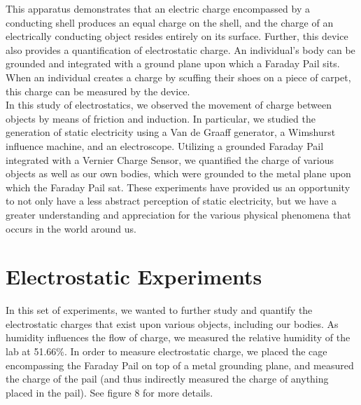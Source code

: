 \documentclass[12pt]{amsart}
\begin{document}
\indent This apparatus demonstrates that an electric charge encompassed by a conducting shell produces an equal charge on the shell, and the charge of an electrically conducting object resides entirely on its surface. Further, this device also provides a quantification of electrostatic charge. An individual’s body can be grounded and integrated with a ground plane upon which a Faraday Pail sits. When an individual creates a charge by scuffing their shoes on a piece of carpet, this charge can be measured by the device.\\

\indent In this study of electrostatics, we observed the movement of charge between objects by means of friction and induction. In particular, we studied the generation of static electricity using a Van de Graaff generator, a Wimshurst influence machine, and an electroscope. Utilizing a grounded Faraday Pail integrated with a Vernier Charge Sensor, we quantified the charge of various objects as well as our own bodies, which were grounded to the metal plane upon which the Faraday Pail sat. These experiments have provided us an opportunity to not only have a less abstract perception of static electricity, but we have a greater understanding and appreciation for the various physical phenomena that occurs in the world around us.

\section{Electrostatic Experiments}
\indent In this set of experiments, we wanted to further study and quantify the electrostatic charges that exist upon various objects, including our bodies. As humidity influences the flow of charge, we measured the relative humidity of the lab at 51.66\%. In order to measure electrostatic charge, we placed the cage encompassing the Faraday Pail on top of a metal grounding plane, and measured the charge of the pail (and thus indirectly measured the charge of anything placed in the pail). See figure 8 for more details. \\
\end{document}

